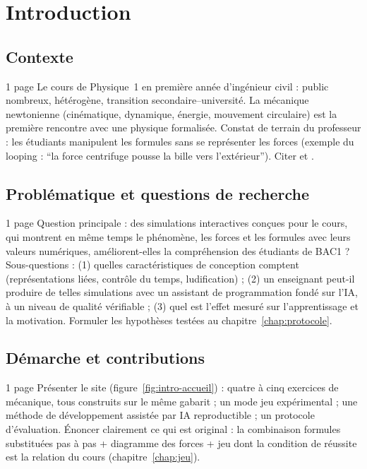
\chapter{Introduction}
\label{chap:introduction}

\section{Contexte}

\begin{arediger}{1 page}
Le cours de Physique~1 en première année d'ingénieur civil : public nombreux,
hétérogène, transition secondaire–université. La mécanique newtonienne
(cinématique, dynamique, énergie, mouvement circulaire) est la première
rencontre avec une physique formalisée. Constat de terrain du professeur :
les étudiants manipulent les formules sans se représenter les forces
(exemple du looping : \enquote{la force centrifuge pousse la bille vers
l'extérieur}). Citer \textcite{hestenes1992fci} et \textcite{hake1998}.
\end{arediger}

\section{Problématique et questions de recherche}

\begin{arediger}{1 page}
Question principale : des simulations interactives conçues pour le cours, qui
montrent en même temps le phénomène, les forces et les formules avec leurs
valeurs numériques, améliorent-elles la compréhension des étudiants de BAC1 ?
Sous-questions : (1) quelles caractéristiques de conception comptent
(représentations liées, contrôle du temps, ludification) ; (2) un enseignant
peut-il produire de telles simulations avec un assistant de programmation
fondé sur l'IA, à un niveau de qualité vérifiable ; (3) quel est l'effet
mesuré sur l'apprentissage et la motivation. Formuler les hypothèses
testées au chapitre~\ref{chap:protocole}.
\end{arediger}

\section{Démarche et contributions}

\begin{arediger}{1 page}
Présenter le site (figure~\ref{fig:intro-accueil}) : quatre à cinq exercices
de mécanique, tous construits sur le même gabarit ; un mode jeu expérimental ;
une méthode de développement assistée par IA reproductible ; un protocole
d'évaluation. Énoncer clairement ce qui est original : la combinaison
formules substituées pas à pas + diagramme des forces + jeu dont la condition
de réussite est la relation du cours (chapitre~\ref{chap:jeu}).
\end{arediger}

